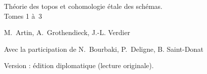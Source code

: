 \documentclass[12pt]{../fichiers-configuration-latex/amsbook}
\begin{document}
\begin{center}
{\Large Théorie des topos et cohomologie étale des schémas.\\
Tomes 1 à 3}\\
\end{center}

\vskip1cm
\begin{center}
M. Artin, A. Grothendieck, J.-L. Verdier
\end{center}

\vskip1cm
\begin{center}
Avec la participation de N. Bourbaki, P. Deligne, B. Saint-Donat
\end{center}

Version : édition diplomatique (lecture originale).
\tableofcontents

\mainmatter

\def\danslelivre{1}

\def\thechapter{\Roman{chapter}}
\def\chaptername{Exposé}






\renewcommand*{\thechapter}{Vbis}

\setcounter{chapter}{5}
\def\thechapter{\Roman{chapter}}















\backmatter
\end{document}

